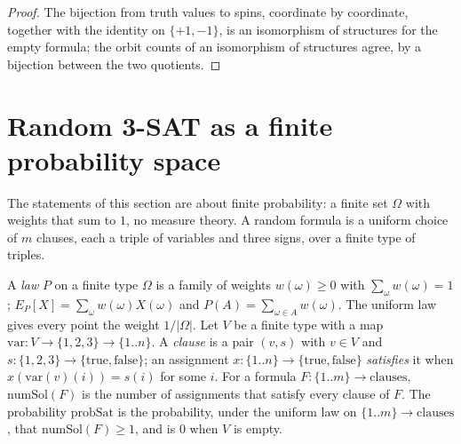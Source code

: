 \begin{proof}
  \leanok
  The bijection from truth values to spins, coordinate by coordinate, together with the identity on
  $\{+1,-1\}$, is an isomorphism of structures for the empty formula; the orbit counts of
  an isomorphism of structures agree, by a bijection between the two quotients.
\end{proof}

\section{Random 3-SAT as a finite probability space}
\label{sec:physics-random-sat}

The statements of this section are about finite probability: a finite set $\Omega$ with weights
that sum to $1$, no measure theory. A random formula is a uniform choice of $m$ clauses, each a
triple of variables and three signs, over a finite type of triples.

\begin{definition}
  \label{def:physics-ley}
  \leanok
  A \emph{law} $P$ on a finite type $\Omega$ is a family of weights $w(\omega) \ge 0$ with
  $\sum_\omega w(\omega) = 1$; $E_P[X] = \sum_\omega w(\omega) X(\omega)$ and
  $P(A) = \sum_{\omega \in A} w(\omega)$. The uniform law gives every point the weight
  $1/|\Omega|$. Let $V$ be a finite type with a map $\mathrm{var} : V \to \{1,2,3\} \to \{1..n\}$. A
  \emph{clause} is a pair $(v, s)$ with $v \in V$ and $s : \{1,2,3\} \to \{\mathrm{true},
  \mathrm{false}\}$; an assignment $x : \{1..n\} \to \{\mathrm{true}, \mathrm{false}\}$
  \emph{satisfies} it when $x(\mathrm{var}(v)(i)) = s(i)$ for some $i$. For a formula
  $F : \{1..m\} \to \text{clauses}$, $\mathrm{numSol}(F)$ is the number of assignments that satisfy
  every clause of $F$. The probability $\mathrm{probSat}$ is the probability, under the uniform law
  on $\{1..m\} \to \text{clauses}$, that $\mathrm{numSol}(F) \ge 1$, and is $0$ when $V$ is empty.
  \own{}
\end{definition}

